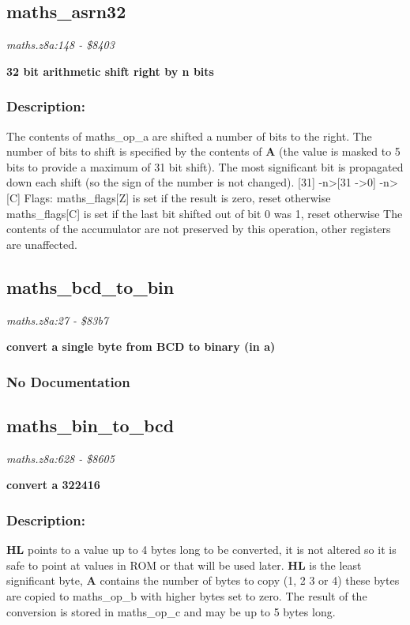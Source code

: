 \subsection{maths\_asrn32}
\textit{maths.z8a:148 - \$8403}

\noindent
\textbf{32 bit arithmetic shift right by n bits}

\subsubsection{Description:}
 The contents of maths\_op\_a are shifted a number of bits to the right.  The number of bits to shift is specified by the contents of \textbf{A} (the value is masked to 5 bits to provide a maximum of 31 bit shift).  The most significant bit is propagated down each shift (so the sign of the number is not changed).  [31] -n\textgreater  [31 -\textgreater  0] -n\textgreater  [C] Flags:  maths\_flags[Z] is set if the result is zero, reset otherwise  maths\_flags[C] is set if the last bit shifted out of bit 0 was 1, reset  otherwise The contents of the accumulator are not preserved by this operation, other registers are unaffected.

\subsection{maths\_bcd\_to\_bin}
\textit{maths.z8a:27 - \$83b7}

\noindent
\textbf{convert a single byte from BCD to binary (in a)}

\subsubsection{No Documentation}


\subsection{maths\_bin\_to\_bcd}
\textit{maths.z8a:628 - \$8605}

\noindent
\textbf{convert a 322416}

\subsubsection{Description:}
 \textbf{HL} points to a value up to 4 bytes long to be converted, it is not altered so it is safe to point at values in ROM or that will be used later.  \textbf{HL} is the least significant byte, \textbf{A} contains the number of bytes to copy (1, 2 3 or 4) these bytes are copied to maths\_op\_b with higher bytes set to zero. The result of the conversion is stored in maths\_op\_c and may be up to 5 bytes long.

